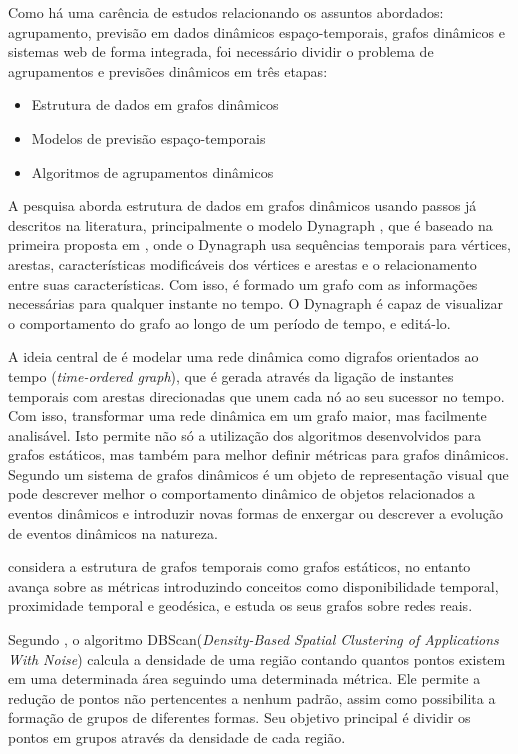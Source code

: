 Como há uma carência de estudos relacionando os assuntos abordados: agrupamento,
previsão em dados dinâmicos espaço-temporais, grafos dinâmicos e sistemas web
de forma integrada, foi necessário dividir o problema de agrupamentos e previsões dinâmicos em três etapas:
\begin{itemize}
\item Estrutura de dados em grafos dinâmicos
\item Modelos de previsão espaço-temporais
\item Algoritmos de agrupamentos dinâmicos
\end{itemize}

A pesquisa aborda estrutura de dados em grafos dinâmicos usando passos já descritos na literatura,
principalmente o modelo Dynagraph \cite{dynagraph}, que é baseado na primeira proposta
em \cite{dynagraph2012}, onde o Dynagraph usa sequências temporais para vértices, arestas,
características modificáveis dos vértices e arestas e o relacionamento entre suas características.
Com isso, é formado um grafo com as informações necessárias para qualquer instante no tempo.
O Dynagraph é capaz de visualizar o comportamento do grafo ao longo de um período de tempo,
e editá-lo.

A ideia central de \cite{kim} é modelar uma rede dinâmica como digrafos orientados ao
tempo (\textit{time-ordered graph}), que é gerada através da ligação de instantes temporais com arestas
direcionadas que unem cada nó ao seu sucessor no tempo. Com isso, transformar uma rede dinâmica
em um grafo maior, mas facilmente analisável. Isto permite não só a utilização dos algoritmos 
desenvolvidos para grafos estáticos, mas também para melhor definir métricas para grafos dinâmicos.
Segundo \cite{kim} um sistema de grafos dinâmicos é um objeto de representação visual
que pode descrever melhor o comportamento dinâmico de objetos relacionados a eventos dinâmicos e
introduzir novas formas de enxergar ou descrever a evolução de eventos dinâmicos na natureza.

\cite{kostakos} considera a estrutura de grafos temporais como grafos
estáticos, no entanto avança sobre as métricas introduzindo conceitos como disponibilidade
temporal, proximidade temporal e geodésica, e estuda os seus grafos sobre redes reais.

Segundo \cite{density-based-clusters}, o algoritmo DBScan(\textit{Density-Based Spatial Clustering
of Applications With Noise}) calcula a densidade de uma região contando quantos pontos existem
em uma determinada área seguindo uma determinada métrica. Ele permite a redução de pontos não
pertencentes a nenhum padrão, assim como possibilita a formação de grupos de diferentes formas.
Seu objetivo principal é dividir os pontos em grupos através da densidade de cada região.


